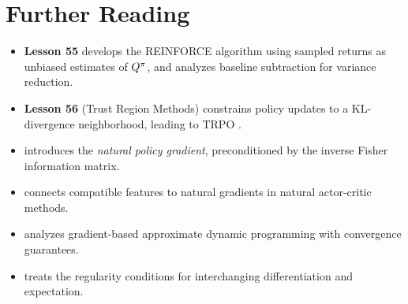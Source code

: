 \documentclass[11pt,a4paper]{article}
\begin{document}
\section{Further Reading}

\begin{itemize}
  \item \textbf{Lesson 55} develops the REINFORCE algorithm using sampled
    returns as unbiased estimates of $Q^{\pi}$, and analyzes baseline
    subtraction for variance reduction.

  \item \textbf{Lesson 56} (Trust Region Methods) constrains policy
    updates to a KL-divergence neighborhood, leading to TRPO
    \citep{schulman2015trpo}.

  \item \citet{kakade2002} introduces the \emph{natural policy gradient},
    preconditioned by the inverse Fisher information matrix.

  \item \citet{peters2008} connects compatible features to natural
    gradients in natural actor-critic methods.

  \item \citet[Chapter 6]{bertsekas1996} analyzes gradient-based
    approximate dynamic programming with convergence guarantees.

  \item \citet[Chapter 2]{kakade2003} treats the regularity conditions
    for interchanging differentiation and expectation.
\end{itemize}


\end{document}
